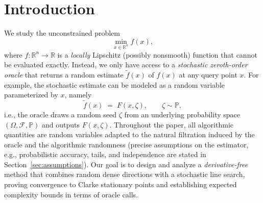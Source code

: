 \documentclass[11pt,a4paper]{article}
\newcommand{\R}{\mathbb{R}}
\begin{document}
\section{Introduction} \label{sec:intro}
We study the unconstrained problem
\begin{equation}\label{gen_prob}
  \min_{x\in\R^n} f(x),
\end{equation}
where $f:\R^n\to\R$ is a \emph{locally} Lipschitz (possibly nonsmooth) function that cannot be evaluated exactly. 
Instead, we only have access  to a \emph{stochastic
zeroth-order oracle} that returns a random estimate $\tilde f(x)$ of $f(x)$ at any query point $x$. For example, %
the stochastic estimate can be modeled as a random variable
parameterized by $x$, namely
\[
  \tilde f(x)\;=\;F(x,\zeta),\qquad \zeta\sim\mathbb P,
\]
i.e., the oracle draws a random seed $\zeta$  from an underlying probability space
$(\Omega,\mathcal F,\mathbb P)$ and outputs $F(x,\zeta)$. 
Throughout the paper, all algorithmic quantities are random variables adapted to
the natural filtration induced by the oracle and the algorithmic randomness (precise assumptions on
the estimator, e.g., probabilistic accuracy, tails, and independence are stated in
Section~\ref{sec:assumptions}).
Our goal is to design and analyze a \emph{derivative-free} method that combines random dense directions with a
stochastic line search, proving convergence to Clarke stationary points and establishing expected
complexity bounds in terms of oracle calls.
\end{document}

